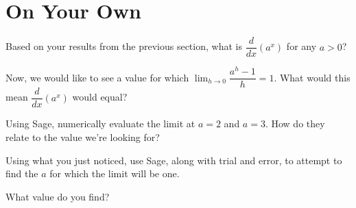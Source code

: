 \documentclass{ximera}
\begin{document}
\section{On Your Own}
\begin{question}
Based on your results from the previous section, what is $\dfrac{d}{dx}(a^x)$ for any $a>0$?
\begin{multipleChoice}
\end{multipleChoice}

\item Now, we would like to see a value for which $\displaystyle \lim_{h \to 0} \dfrac{a^h-1}{h} = 1$. What would this mean $\dfrac{d}{dx}(a^x)$ would equal?
\begin{multipleChoice}
\end{multipleChoice}


Using Sage, numerically evaluate the limit at $a = 2$ and $a = 3$. How do they relate to the value we're looking for?

\begin{onlineOnly}
\begin{sageCell}

\end{sageCell}
\end{onlineOnly}

\begin{multipleChoice}
\end{multipleChoice}

Using what you just noticed, use Sage, along with trial and error, to attempt to find the $a$ for which the limit will be one.

\begin{onlineOnly}
\begin{sageCell}

\end{sageCell}
\end{onlineOnly}

What value do you find?
\begin{multipleChoice}
\end{multipleChoice}


\end{question}
\end{document}
